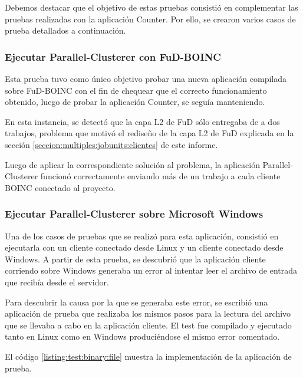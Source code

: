 Debemos destacar que el objetivo de estas pruebas consistió en complementar las pruebas realizadas con la aplicación Counter. Por ello, se crearon varios casos de prueba detallados a continuación.

\subsubsection{Ejecutar Parallel-Clusterer con FuD-BOINC}

Esta prueba tuvo como único objetivo probar una nueva aplicación compilada sobre FuD-BOINC con el fin de chequear que el correcto funcionamiento obtenido, luego de probar la aplicación Counter, se seguía manteniendo.

En esta instancia, se detectó que la capa L2 de FuD sólo entregaba de a dos trabajos, problema que motivó el rediseño de la capa L2 de FuD explicada en la sección \ref{seccion:multiples:jobunits:clientes} de este informe. 

Luego de aplicar la correspondiente solución al problema, la aplicación Parallel-Clusterer funcionó correctamente enviando más de un trabajo a cada cliente BOINC conectado al proyecto.

\subsubsection{Ejecutar Parallel-Clusterer sobre Microsoft Windows}

Una de los casos de pruebas que se realizó para esta aplicación, consistió en ejecutarla con un cliente conectado desde Linux y un cliente conectado desde Windows. A partir de esta prueba, se descubrió que la aplicación cliente corriendo sobre Windows generaba un error al intentar leer el archivo de entrada que recibía desde el servidor.

Para descubrir la causa por la que se generaba este error, se escribió una aplicación de prueba que realizaba los mismos pasos para la lectura del archivo que se llevaba a cabo en la aplicación cliente. El test fue compilado y ejecutado tanto en Linux como en Windows produciéndose el mismo error comentado. 

El código \ref{listing:test:binary:file} muestra la implementación de la aplicación de prueba.

